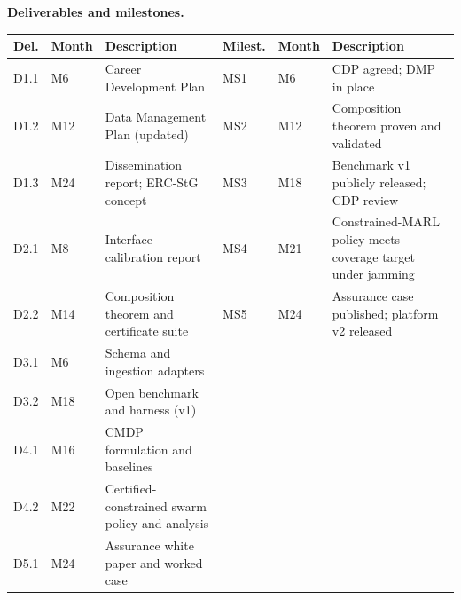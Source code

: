 \documentclass[11pt,a4paper]{article}
\begin{document}
\textbf{Deliverables and milestones.}
\begin{center}
\begin{tabularx}{\linewidth}{@{}p{1.3cm}p{1.1cm}Y|p{1.3cm}p{1.1cm}Y@{}}
\toprule
{}
\textbf{Del.} & \textbf{Month} & \textbf{Description} & \textbf{Milest.} & \textbf{Month} & \textbf{Description} \\
\midrule
D1.1 & M6 & Career Development Plan & MS1 & M6 & CDP agreed; DMP in place \\
D1.2 & M12 & Data Management Plan (updated) & MS2 & M12 & Composition theorem proven and validated \\
D1.3 & M24 & Dissemination report; ERC-StG concept & MS3 & M18 & Benchmark v1 publicly released; CDP review \\
D2.1 & M8 & Interface calibration report & MS4 & M21 & Constrained-MARL policy meets coverage target under jamming \\
D2.2 & M14 & Composition theorem and certificate suite & MS5 & M24 & Assurance case published; platform v2 released \\
D3.1 & M6 & Schema and ingestion adapters & & & \\
D3.2 & M18 & Open benchmark and harness (v1) & & & \\
D4.1 & M16 & CMDP formulation and baselines & & & \\
D4.2 & M22 & Certified-constrained swarm policy and analysis & & & \\
D5.1 & M24 & Assurance white paper and worked case & & & \\
\bottomrule
\end{tabularx}
\end{center}
\end{document}
